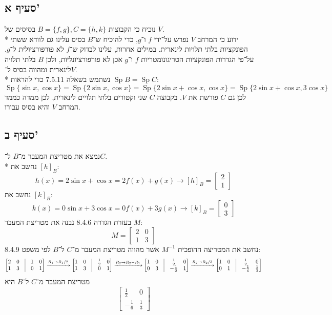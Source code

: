 \documentclass[a4paper]{article}
\DeclareMathOperator\Sp{Sp}
\begin{document}
\subsection{סעיף א'}
נוכיח כי הקבוצות $B = \{f, g\}, C = \{h, k\}$ בסיסים של $V$. \\*
ידוע כי המרחב $V$ נפרש על־ידי $f$ ו־$g$,
כדי להוכיח ש־$B$ בסיס עלינו גם לוודא ששתי הפונקציות בלתי תלויות לינארית.
במילים אחרות, עלינו לבדוק ש־$f$ לא פורפורציולית ל־$g$.
על־פי הגדרות הפונקציות הטריגונומטריות $f$ ו־$g$ אכן לא פורפורציונליות,
ולכן $B$ בלתי תלויה לינארית ומהווה בסיס ל־$V$. \\*
נשתמש בשאלה 7.5.11 כדי להראות $\Sp B = \Sp C$:
\[
	\Sp\{\sin x, \cos x\}
	= \Sp\{2 \sin x, \cos x\}
	= \Sp\{2 \sin x + \cos x, \cos x\}
	= \Sp\{2 \sin x + \cos x, 3\cos x\}
\]
לכן גם $C$ פורשת את $V$.
בקבוצה $C$ שני וקטורים בלתי תלויים לינארית, לכן ממדה כממד המרחב $V$ והיא בסיס עבורו.

\subsection{סעיף ב'}
נמצא את מטריצת המעבר מ־$B$ ל־$C$. \\*
נחשב את ${[h]}_B$:
\[
	h(x) = 2 \sin x + \cos x = 2 f(x) + g(x) \rightarrow 
	{[h]}_B = \begin{bmatrix} 2 \\ 1 \end{bmatrix}
\]
נחשב את ${[k]}_B$:
\[
	k(x) = 0 \sin x + 3 \cos x = 0 f(x) + 3 g(x) \rightarrow
	{[k]}_B = \begin{bmatrix} 0 \\ 3 \end{bmatrix}
\]
בעזרת הגדרה 8.4.6 נבנה את מטריצת המעבר $M$:
\[
	M =
	\begin{bmatrix}
		2 & 0 \\
		1 & 3
	\end{bmatrix}
\]
נחשב את המטריצה ההופכית $M^{-1}$ אשר מהווה מטריצת המעבר מ־$C$ ל־$B$
לפי משפט 8.4.9:
\[
	\begin{bmatrix}
		2 & 0 & \vline & 1 & 0 \\
		1 & 3 & \vline & 0 & 1
	\end{bmatrix}
	\xrightarrow{R_1 \to R_1 / 2}
	\begin{bmatrix}
		1 & 0 & \vline & {\frac{1}{2}} & 0 \\
		1 & 3 & \vline & 0 & 1
	\end{bmatrix}
	\xrightarrow{R_2 \to R_2 - R_1}
	\begin{bmatrix}
		1 & 0 & \vline & {\frac{1}{2}} & 0 \\
		0 & 3 & \vline & -{\frac{1}{2}} & 1
	\end{bmatrix}
	\xrightarrow{R_2 \to R_2 / 3}
	\begin{bmatrix}
		1 & 0 & \vline & {\frac{1}{2}} & 0 \\
		0 & 1 & \vline & -{\frac{1}{6}} & {\frac{1}{3}}
	\end{bmatrix}
\]
מטריצת המעבר מ־$C$ ל־$B$ היא
\[
	\begin{bmatrix}
		{\frac{1}{2}} & 0 \\
		-{\frac{1}{6}} & {\frac{1}{3}}
	\end{bmatrix}
\]
\end{document}
